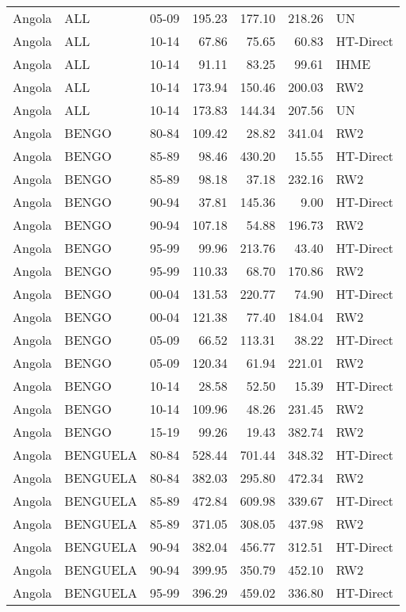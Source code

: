 \begin{longtable}{lllrrrl}
  Angola & ALL & 05-09 & 195.23 & 177.10 & 218.26 & UN \\ 
  Angola & ALL & 10-14 & 67.86 & 75.65 & 60.83 & HT-Direct \\ 
  Angola & ALL & 10-14 & 91.11 & 83.25 & 99.61 & IHME \\ 
  Angola & ALL & 10-14 & 173.94 & 150.46 & 200.03 & RW2 \\ 
  Angola & ALL & 10-14 & 173.83 & 144.34 & 207.56 & UN \\ 
  Angola & BENGO & 80-84 & 109.42 & 28.82 & 341.04 & RW2 \\ 
  Angola & BENGO & 85-89 & 98.46 & 430.20 & 15.55 & HT-Direct \\ 
  Angola & BENGO & 85-89 & 98.18 & 37.18 & 232.16 & RW2 \\ 
  Angola & BENGO & 90-94 & 37.81 & 145.36 & 9.00 & HT-Direct \\ 
  Angola & BENGO & 90-94 & 107.18 & 54.88 & 196.73 & RW2 \\ 
  Angola & BENGO & 95-99 & 99.96 & 213.76 & 43.40 & HT-Direct \\ 
  Angola & BENGO & 95-99 & 110.33 & 68.70 & 170.86 & RW2 \\ 
  Angola & BENGO & 00-04 & 131.53 & 220.77 & 74.90 & HT-Direct \\ 
  Angola & BENGO & 00-04 & 121.38 & 77.40 & 184.04 & RW2 \\ 
  Angola & BENGO & 05-09 & 66.52 & 113.31 & 38.22 & HT-Direct \\ 
  Angola & BENGO & 05-09 & 120.34 & 61.94 & 221.01 & RW2 \\ 
  Angola & BENGO & 10-14 & 28.58 & 52.50 & 15.39 & HT-Direct \\ 
  Angola & BENGO & 10-14 & 109.96 & 48.26 & 231.45 & RW2 \\ 
  Angola & BENGO & 15-19 & 99.26 & 19.43 & 382.74 & RW2 \\ 
  Angola & BENGUELA & 80-84 & 528.44 & 701.44 & 348.32 & HT-Direct \\ 
  Angola & BENGUELA & 80-84 & 382.03 & 295.80 & 472.34 & RW2 \\ 
  Angola & BENGUELA & 85-89 & 472.84 & 609.98 & 339.67 & HT-Direct \\ 
  Angola & BENGUELA & 85-89 & 371.05 & 308.05 & 437.98 & RW2 \\ 
  Angola & BENGUELA & 90-94 & 382.04 & 456.77 & 312.51 & HT-Direct \\ 
  Angola & BENGUELA & 90-94 & 399.95 & 350.79 & 452.10 & RW2 \\ 
  Angola & BENGUELA & 95-99 & 396.29 & 459.02 & 336.80 & HT-Direct \\ 

\end{longtable}
